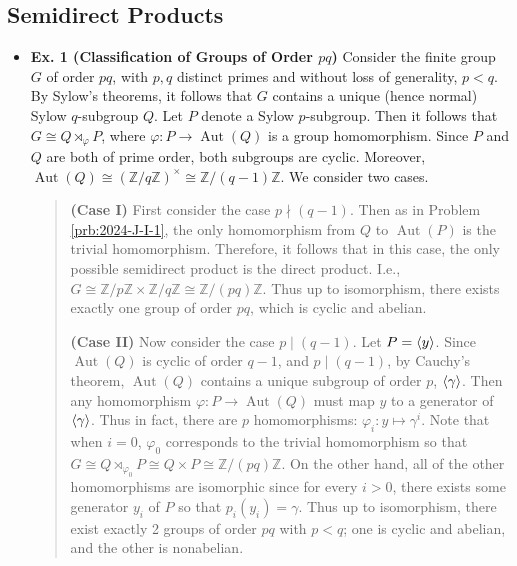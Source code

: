 \documentclass{article}
\begin{document}
	\newpage 
	\subsection{Semidirect Products}
	
	\begin{itemize}
		\item \textbf{Ex. 1 (Classification of Groups of Order $pq$)} Consider the finite group $G$ of order $pq$, with $p, q$ distinct primes and without loss of generality, $p < q$. By Sylow's theorems, it follows that $G$ contains a unique (hence normal) Sylow $q$-subgroup $Q$. Let $P$ denote a Sylow $p$-subgroup. Then it follows that $G \cong Q \rtimes_{\varphi} P$, where $\varphi: P \to \operatorname{Aut}(Q)$ is a group homomorphism. Since $P$ and $Q$ are both of prime order, both subgroups are cyclic. Moreover, $\operatorname{Aut}(Q) \cong (\mathbb{Z}/q\mathbb{Z})^{\times} \cong \mathbb{Z}/(q -1)\mathbb{Z}$. We consider two cases. 
		\begin{quote}
			\textbf{(Case I)} First consider the case $p \nmid (q - 1)$. Then as in Problem \ref{prb:2024-J-I-1}, the only homomorphism from $Q$ to $\operatorname{Aut}(P)$ is the trivial homomorphism. Therefore, it follows that in this case, the only possible semidirect product is the direct product. I.e., $G \cong \mathbb{Z}/p\mathbb{Z} \times \mathbb{Z}/q\mathbb{Z} \cong \mathbb{Z}/(pq)\mathbb{Z}$. Thus up to isomorphism, there exists exactly one group of order $pq$, which is cyclic and abelian. 
			
			\textbf{(Case II)} Now consider the case $p \mid (q - 1)$. Let $P = \braket{y}$. Since $\operatorname{Aut}(Q)$ is cyclic of order $q - 1$, and $p \mid (q - 1)$, by Cauchy's theorem, $\operatorname{Aut}(Q)$ contains a unique subgroup of order $p$, $\braket{\gamma}$. Then any homomorphism $\varphi: P \to \operatorname{Aut}(Q)$ must map $y$ to a generator of $\braket{\gamma}$. Thus in fact, there are $p$ homomorphisms: $\varphi_{i}: y \mapsto \gamma^{i}$. Note that when $i = 0$, $\varphi_{0}$ corresponds to the trivial homomorphism so that $G \cong Q \rtimes_{\varphi_{0}} P \cong Q \times P \cong\mathbb{Z}/(pq)\mathbb{Z}$. On the other hand, all of the other homomorphisms are isomorphic since for every $i > 0$, there exists some generator $y_{i}$ of $P$ so that $p_{i}(y_{i}) = \gamma$. Thus up to isomorphism, there exist exactly 2 groups of order $pq$ with $p < q$; one is cyclic and abelian, and the other is nonabelian. 
		\end{quote}
		

\end{itemize}
\end{document}
